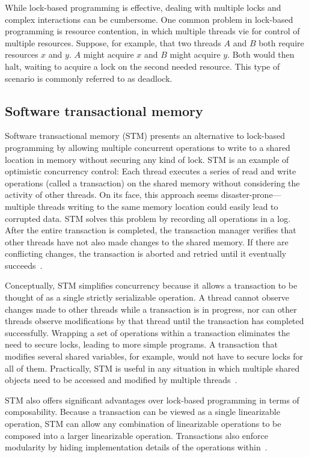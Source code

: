 \documentclass{sig-alternate}
\begin{document}
While lock-based programming is effective, dealing with multiple locks and complex interactions can be cumbersome. One common problem in lock-based programming is resource contention, in which multiple threads vie for control of multiple resources. Suppose, for example, that two threads $A$ and $B$ both require resources $x$ and $y$. $A$ might acquire $x$ and $B$ might acquire $y$. Both would then halt, waiting to acquire a lock on the second needed resource. This type of scenario is commonly referred to as deadlock.

\subsection{Software transactional memory}

Software transactional memory (STM) presents an alternative to lock-based programming by allowing multiple concurrent operations to write to a shared location in memory without securing any kind of lock. STM is an example of optimistic concurrency control: Each thread executes a series of read and write operations (called a transaction) on the shared memory without considering the activity of other threads. On its face, this approach seems disaster-prone---multiple threads writing to the same memory location could easily lead to corrupted data. STM solves this problem by recording all operations in a log. After the entire transaction is completed, the transaction manager verifies that other threads have not also made changes to the shared memory. If there are conflicting changes, the transaction is aborted and retried until it eventually succeeds~\cite{Shavit1995}.

Conceptually, STM simplifies concurrency because it allows a transaction to be thought of as a single strictly serializable operation. A thread cannot observe changes made to other threads while a transaction is in progress, nor can other threads observe modifications by that thread until the transaction has completed successfully. Wrapping a set of operations within a transaction eliminates the need to secure locks, leading to more simple programs. A transaction that modifies several shared variables, for example, would not have to secure locks for all of them. Practically, STM is useful in any situation in which multiple shared objects need to be accessed and modified by multiple threads~\cite{Swalens2014}.

STM also offers significant advantages over lock-based programming in terms of composability. Because a transaction can be viewed as a single linearizable operation, STM can allow any combination of linearizable operations to be composed into a larger linearizable operation. Transactions also enforce modularity by hiding implementation details of the operations within~\cite{Harris2005}.
\end{document}
